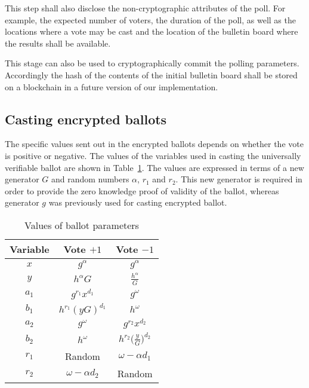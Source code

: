 This step shall also disclose the non-cryptographic
attributes of the poll. For example, the expected number of voters,
the duration of the poll, as well as the
locations where a vote may be cast and the location of the
bulletin board where the results shall be available.

This stage can also be used to cryptographically commit the
polling parameters.  Accordingly the hash of the contents of the
initial bulletin board shall be stored on a blockchain
in a future version of our implementation.


\subsection{Casting encrypted ballots}

The specific values sent out in the encrypted ballots depends on
whether the vote is positive or negative.  The values of the variables
used in casting the universally verifiable ballot are shown in
Table~\ref{table:ballotparams}.  The values are expressed in terms of
a new generator $G$ and random numbers $\alpha$, $r_1$ and $r_2$.
This new generator is required in order to
provide the zero knowledge proof of validity of the ballot,
whereas generator $g$ was previously used for casting encrypted ballot.




\begin{table}[t]
\caption{Values of ballot parameters}
\begin{center}
  \begin{tabular}{c|c|c} 
    Variable & Vote $+1$ & Vote $-1$ \\\hline
    $x$   &  $g^\alpha$ &   $g^\alpha$ \\
    $y$   &  $h^\alpha G$ & $\frac{h^\alpha}{G}$  \\
    $a_1$ &  $g^{r_1}x^{d_1}$ & $g^\omega$  \\
    $b_1$ &  $h^{r_1}(yG)^{d_1}$ & $h^\omega$  \\
    $a_2$ &  $g^\omega$ &  $g^{r_2}x^{d_2}$ \\
    $b_2$ &  $h^\omega$ & $h^{r_2} \big( \frac{y}{G} \big)^{d_2}$ \\
    $r_1$ &    Random     &  $\omega - \alpha d_1$ \\
    $r_2$ &  $\omega - \alpha d_2$ & Random \\
\end{tabular}
\label{table:ballotparams}
\end{center}
\end{table}



